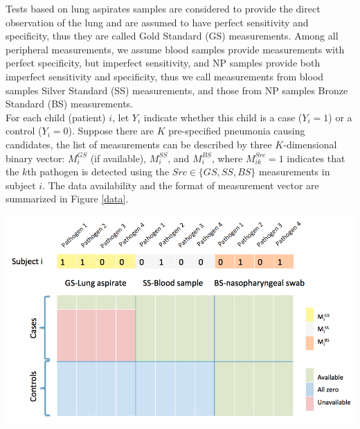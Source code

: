 \documentclass[11 pt, a4paper]{article}  %
\begin{document}
Tests based on lung aspirates samples are considered to provide the direct observation of the lung and are assumed to have perfect sensitivity and specificity, thus they are called Gold Standard (GS) measurements. Among all peripheral measurements, we assume blood samples provide measurements with perfect specificity, but imperfect sensitivity, and NP samples provide both imperfect sensitivity and specificity, thus we call measurements from blood samples Silver Standard (SS) measurements, and those from NP samples Bronze Standard (BS) measurements.\\

For each child (patient) $i$, let $Y_i$ indicate whether this child is a case ($Y_i=1$) or a control ($Y_i=0$). Suppose there are $K$ pre-specified pneumonia causing candidates, the list of measurements can be described by three $K$-dimensional binary vector: $M_i^{GS}$ (if available), $M_i^{SS}$, and $M_i^{BS}$, where $M_{ik}^{Src}=1$ indicates that the $k$th pathogen is detected using the $Src \in \{GS, SS, BS\}$ measurements in subject $i$. The data availability and the format of measurement vector are summarized in Figure \ref{data}. \\

\begin{center}
\includegraphics[scale=0.45]{DataDescription.png}
\label{data}
\end{center}
\end{document}
